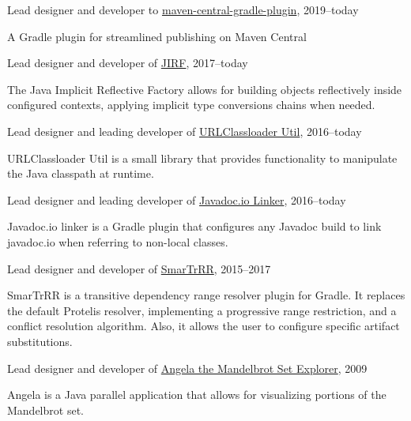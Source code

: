 \documentclass[10pt]{article}
\newenvironment{innerlist}[1][\enskip\textbullet]%
        {\begin{compactitem}[#1]}{\end{compactitem}}
\newcommand{\halfblankline}{\quad\vspace{-0.5\baselineskip}\pagebreak[3]}
\begin{document}
Lead designer and developer to \href{https://github.com/DanySK/maven-central-gradle-plugin}{maven-central-gradle-plugin}, 2019--today
\begin{innerlist}
    \item A Gradle plugin for streamlined publishing on Maven Central
\end{innerlist}
\halfblankline

Lead designer and developer of \href{https://github.com/DanySK/jirf}{JIRF}, 2017--today
\begin{innerlist}
    \item The Java Implicit Reflective Factory allows for building objects reflectively inside configured contexts, applying implicit type conversions chains when needed.
\end{innerlist}
\halfblankline

Lead designer and leading developer of \href{https://github.com/DanySK/urlclassloader-util}{URLClassloader Util}, 2016--today
\begin{innerlist}
    \item URLClassloader Util is a small library that provides functionality to manipulate the Java classpath at runtime.
\end{innerlist}
\halfblankline

Lead designer and leading developer of \href{https://github.com/DanySK/javadoc.io-linker}{Javadoc.io Linker}, 2016--today
\begin{innerlist}
    \item Javadoc.io linker is a Gradle plugin that configures any Javadoc build to link javadoc.io when referring to non-local classes.
\end{innerlist}
\halfblankline

Lead designer and developer of \href{https://github.com/DanySK/SmarTrRR}{SmarTrRR}, 2015--2017
\begin{innerlist}
    \item SmarTrRR is a transitive dependency range resolver plugin for Gradle. It replaces the default Protelis resolver, implementing a progressive range restriction, and a conflict resolution algorithm. Also, it allows the user to configure specific artifact substitutions.
\end{innerlist}
\halfblankline

Lead designer and developer of \href{https://sourceforge.net/projects/mandelbrot/}{Angela the Mandelbrot Set Explorer}, 2009
\begin{innerlist}
  \item Angela is a Java parallel application that allows for visualizing portions of the Mandelbrot set.
\end{innerlist}
\halfblankline
\end{document}
